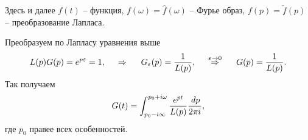 Здесь и далее $f(t)$ -- функция, $f(\omega) = \hat{f}(\omega)$ -- Фурье образ, $f(p) = \tilde{f}(p)$ -- преобразование Лапласа. 

Преобразуем по Лапласу уравнения выше
\begin{equation*}
     L(p) G(p) = e^{p \varepsilon} = 1,
     \hspace{0.5cm} \Rightarrow \hspace{0.5cm}
     G_\varepsilon (p) = \frac{1}{L(p)},
     \hspace{0.5cm} \overset{\varepsilon \to 0}{\Rightarrow}  \hspace{0.5cm}
     G(p) = \frac{1}{L(p)}.
 \end{equation*} 
Так получаем
\begin{equation*}
    G(t) = \int_{p_0 - i \infty}^{p_0 + i \omega} \frac{e^{pt}}{L(p)} \frac{\, d p}{2\pi i},
\end{equation*}
где $p_0$ правее всех особенностей. 


